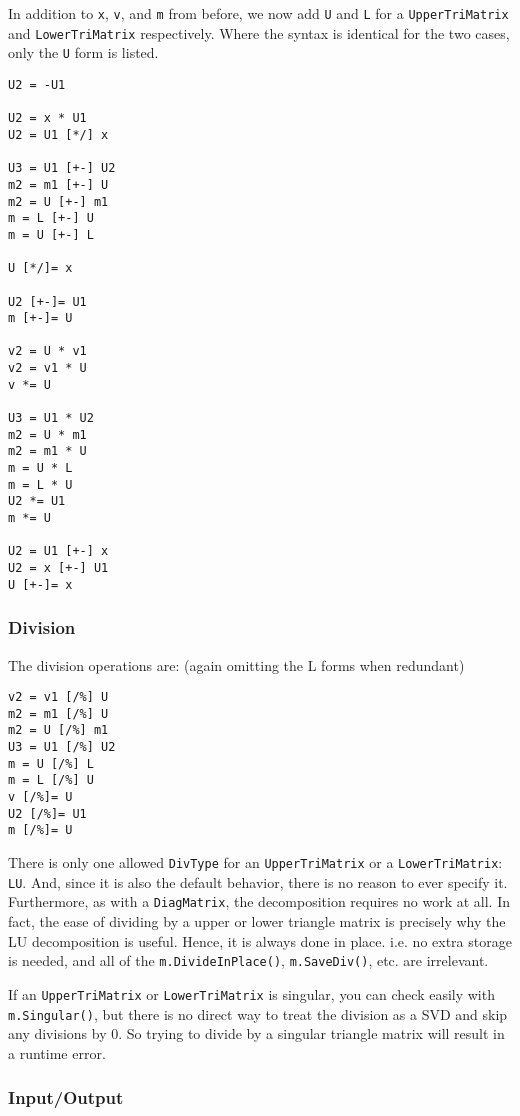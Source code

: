 \documentclass[twoside,letterpaper,11pt]{article}
\renewcommand{\tt}[1]{{\texttt {#1}}}
\begin{document}
In addition to \tt{x}, \tt{v}, and \tt{m} from before, 
we now add \tt{U} and \tt{L} for a \tt{UpperTriMatrix}
and \tt{LowerTriMatrix} respectively.  Where the syntax is identical
for the two cases, only the \tt{U} form is listed.

\begin{verbatim}
U2 = -U1

U2 = x * U1
U2 = U1 [*/] x

U3 = U1 [+-] U2
m2 = m1 [+-] U
m2 = U [+-] m1
m = L [+-] U
m = U [+-] L

U [*/]= x

U2 [+-]= U1
m [+-]= U

v2 = U * v1
v2 = v1 * U
v *= U

U3 = U1 * U2
m2 = U * m1
m2 = m1 * U
m = U * L
m = L * U
U2 *= U1
m *= U

U2 = U1 [+-] x
U2 = x [+-] U1
U [+-]= x

\end{verbatim}

\subsubsection{Division}

The division operations are: (again omitting the L forms when redundant)
\begin{verbatim}
v2 = v1 [/%] U
m2 = m1 [/%] U
m2 = U [/%] m1
U3 = U1 [/%] U2
m = U [/%] L
m = L [/%] U
v [/%]= U
U2 [/%]= U1
m [/%]= U
\end{verbatim}

There is only one allowed \tt{DivType} for an \tt{UpperTriMatrix} or a 
\tt{LowerTriMatrix}: \tt{LU}.
And, since it is also the default behavior,
there is no reason to ever specify it.
Furthermore, as with a \tt{DiagMatrix},
the decomposition requires no work at all.  In fact, the ease of dividing by a 
upper or lower triangle matrix is precisely why the LU decomposition is useful.
Hence, it is always done in place.  i.e. no extra storage is needed, and all of
the \tt{m.DivideInPlace()}, \tt{m.SaveDiv()}, etc. are irrelevant.

If an \tt{UpperTriMatrix} or \tt{LowerTriMatrix} is singular, 
you can check easily with \tt{m.Singular()},
but there is no direct way to treat the division as a SVD and skip any
divisions by 0.  So trying to divide by a singular triangle matrix 
will result in a runtime error.

\subsubsection{Input/Output}
\end{document}
